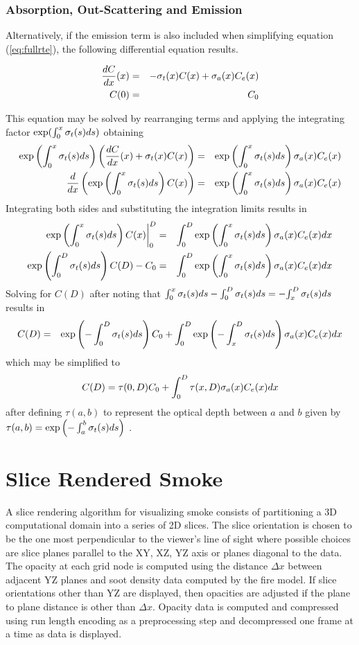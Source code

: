 %
%

\subsubsection{Absorption, Out-Scattering and Emission}
Alternatively, if the emission term is also included when simplifying equation (\ref{eq:fullrte}),  the following differential equation results.

\begin{eqnarray}
\label{eq:simple_rte}
\frac{dC}{dx}(x)&=&-\sigma_t(x) C(x) + \sigma_a(x) C_e(x)\\
 C(0)&=&C_0\nonumber
\end{eqnarray}

This equation may be solved by rearranging terms and applying the integrating factor $\exp(\int_0^x \sigma_t(s) ds)$ obtaining
\begin{eqnarray*}
\exp\left({\int_0^x \sigma_t(s) ds}\right)\left(\frac{dC}{dx}(x)+\sigma_t(x) C(x)\right)&=&  \exp\left({\int_0^x \sigma_t(s) ds}\right)\sigma_a(x) C_e(x)\\
\frac{d}{dx}\left(\exp\left({\int_0^x \sigma_t(s) ds}\right) C(x)\right)&=& \exp\left({\int_0^x \sigma_t(s) ds}\right)\sigma_a(x) C_e(x)
\end{eqnarray*}
Integrating both sides and substituting the integration limits results in
\begin{eqnarray*}
\left.\exp\left({\int_0^x \sigma_t(s) ds}\right) C(x)\right|_0^D&=& \int_0^D\exp\left({\int_0^x \sigma_t(s) ds}\right)\sigma_a(x) C_e(x) dx \\
\exp\left({\int_0^D \sigma_t(s) ds}\right) C(D)-C_0&=& \int_0^D\exp\left({\int_0^x \sigma_t(s) ds}\right)\sigma_a(x) C_e(x) dx
\end{eqnarray*}
Solving for $C(D)$ after noting that
${\int_0^x \sigma_t(s) ds}-{\int_0^D \sigma_t(s) ds}=-{\int_x^D \sigma_t(s) ds}$ results in
\begin{eqnarray*}
C(D)&=&\exp\left({-\int_0^D \sigma_t(s) ds}\right) C_0+ \int_0^D\exp\left({-\int_x^D \sigma_t(s) ds}\right)\sigma_a(x) C_e(x) dx\\
\end{eqnarray*}
which may be simplified to
\begin{equation}
 C(D)=\tau(0,D)C_0 + \int_0^D\tau(x,D)\sigma_a(x)C_e(x) dx
\end{equation}
after defining $\tau(a,b)$ to represent the optical depth between $a$ and $b$ given
by $\tau(a,b)=\exp\left({-\int_a^b \sigma_t(s) ds}\right)$ .


%
%

\section{Slice Rendered Smoke}
A slice rendering algorithm for visualizing smoke consists of partitioning a 3D computational domain into a series of 2D slices.  The slice orientation is chosen to be the one most perpendicular to the viewer's line of sight where possible choices are slice planes parallel to the XY, XZ, YZ axis or planes diagonal to the data.  The opacity at each grid node is computed using the distance $\Delta x$ between adjacent YZ planes and soot density data computed by the fire model.  If slice orientations other than YZ are displayed, then opacities are adjusted if the plane to plane distance is other than $\Delta x$.  Opacity data is computed and compressed using run length encoding as a preprocessing step and decompressed one frame at a time as data is displayed.



